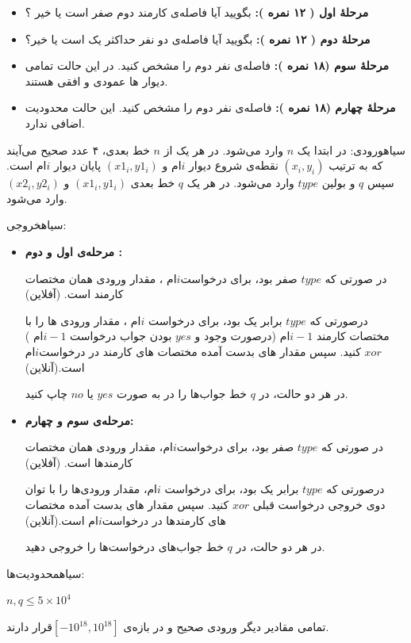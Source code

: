\begin{itemize}
	\item \textbf{ مرحلۀ اول ( ۱۲ نمره ):}
	بگویید آیا فاصله‌ی کارمند دوم صفر است یا خیر ؟
	\item \textbf{ مرحلۀ دوم ( ۱۲ نمره ):}
	 بگویید آیا فاصله‌ی دو نفر حداکثر یک است یا خیر؟
	\item \textbf{ مرحلۀ سوم (۱۸ نمره ):}
	فاصله‌ی نفر دوم را مشخص کنید.  در این حالت تمامی دیوار ها عمودی و افقی هستند.
	\item \textbf{ مرحلۀ چهارم (۱۸ نمره ):}
	فاصله‌ی نفر دوم را مشخص کنید. این حالت محدودیت اضافی ندارد.
\end{itemize}


‌سیاه{ورودی:}
در ابتدا یک ${n}$ وارد می‌شود. در هر یک از ${n}$  خط بعدی، ۴ عدد صحیح می‌آیند که به ترتیب ${(x_i , y_i)}$  نقطه‌ی شروع دیوار ${i}$ام  و ${(x1_i , y1_i)}$ پایان دیوار ${i}$ام است. 
سپس ${q}$ و بولین ${type}$ وارد می‌شود.  در هر یک ${q}$ خط بعدی ${(x1_i , y1_i)}$ و ${(x2_i, y2_i)}$ وارد می‌شود.


‌سیاه{خروجی:}

\begin{itemize}
	\item \textbf{ مرحله‌ی اول و دوم :}
	
	در صورتی که ${type}$  صفر بود، برای درخواست${i}$ام ، مقدار ورودی همان مختصات کارمند است. (آفلاین)
	
درصورتی که ${type}$  برابر یک بود، برای درخواست ${i}$ام ، مقدار ورودی ها را با مختصات کارمند ${i-1}$ام (درصورت وجود و ${yes}$ بودن جواب درخواست ${i-1}$ام  ) ${xor}$ کنید. سپس مقدار های بدست آمده مختصات های کارمند در درخواست${i}$ام  است.(آنلاین)

در هر دو حالت، در ${q}$  خط جواب‌ها را  در به صورت ${yes}$ یا ${no}$ چاپ کنید.

	\item \textbf{ مرحله‌ی سوم و چهارم:}
	
	در صورتی که ${type}$  صفر بود، برای درخواست${i}$ام، مقدار ورودی همان مختصات کارمندها است. (آفلاین)

درصورتی که ${type}$ برابر یک بود، برای درخواست ${i}$ام، مقدار ورودی‌ها را با توان دوی خروجی درخواست قبلی ${xor}$ کنید. سپس مقدار های بدست آمده مختصات های کارمند‌ها در درخواست${i}$ام است.(آنلاین)

در هر دو حالت، در ${q}$ خط جواب‌های درخواست‌ها را خروجی دهید.

\end{itemize}


‌سیاه{محدودیت‌ها: }


\begin{center}
    ${n,q \leq 5 \times 10^4 }$
\end{center}

تمامی مقادیر دیگر ورودی صحیح و در بازه‌ی $ [ -10 ^ {18} , 10 ^ {18} ] $قرار دارند.
